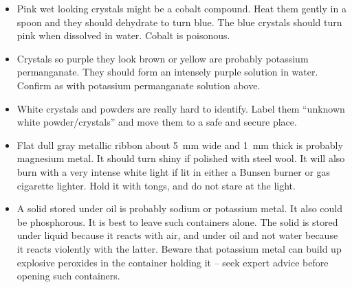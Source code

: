 \begin{itemize}
\item{Pink wet looking crystals might be a cobalt compound. 
Heat them gently in a spoon and they should dehydrate to turn blue. 
The blue crystals should turn pink when dissolved in water. 
Cobalt is poisonous.}

\item{Crystals so purple they look brown or yellow 
are probably potassium permanganate. 
They should form an intensely purple solution in water. 
Confirm as with potassium permanganate solution above.}

\item{White crystals and powders are really hard to identify. 
Label them ``unknown white powder/crystals'' 
and move them to a safe and secure place.}

\item{Flat dull gray metallic ribbon about 5~mm wide 
and 1~mm thick is probably magnesium metal. 
It should turn shiny if polished with steel wool. 
It will also burn with a very intense white light 
if lit in either a Bunsen burner or gas cigarette lighter. 
Hold it with tongs, 
and do not stare at the light.}

\item{A solid stored under oil is probably sodium or potassium metal. 
It also could be phosphorous. It is best to leave such containers alone. 
The solid is stored under liquid because it reacts with air, 
and under oil and not water because it reacts violently with the latter. 
Beware that potassium metal can build up explosive peroxides in the container holding it -- 
seek expert advice before opening such containers.}

\end{itemize}
